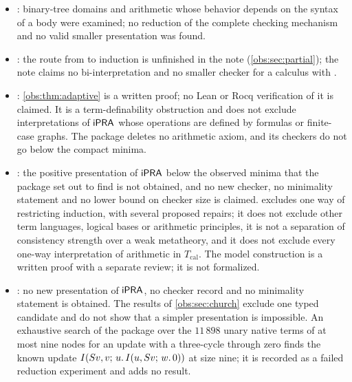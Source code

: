 \begin{itemize}
Replacing computation supply by numerical definitional conversion requires a
reducer that respects dummy slots, the state binder, neutral counters and rigid
parameters, and gave no smaller checker. Binders in the certificate grammar,
with eigenparameters allocated by the opener, require a new proof-opening
discipline, and no complete smaller construction was obtained.
\item {}: binary-tree domains and arithmetic whose
behavior depends on the syntax of a body were examined; no reduction of the
complete checking mechanism and no valid smaller presentation was found.
\item {}: the route from  to induction is
unfinished in the note (\cref{obs:sec:partial}); the note claims no
bi-interpretation and no smaller checker for a calculus with .
\item {}: \cref{obs:thm:adaptive} is a written proof; no
Lean or Rocq verification of it is claimed. It is a term-definability
obstruction and does not exclude interpretations of $\mathsf{iPRA}$ whose operations
are defined by formulas or finite-case graphs. The package deletes no
arithmetic axiom, and its checkers do not go below the compact minima.
\item {}: the positive presentation of $\mathsf{iPRA}$ below the
observed minima that the package set out to find is not obtained, and no new
checker, no minimality statement and no lower bound on checker size is
claimed.  excludes one way of restricting
induction, with several proposed repairs; it does not exclude other term
languages, logical bases or arithmetic principles, it is not a separation of
consistency strength over a weak metatheory, and it does not exclude every
one-way interpretation of arithmetic in $T_{\mathrm{cal}}$. The model
construction is a written proof with a separate review; it is not formalized.
\item {}: no new presentation of $\mathsf{iPRA}$, no checker record
and no minimality statement is obtained. The results of \cref{obs:sec:church}
exclude one typed candidate and do not show that a simpler presentation is
impossible. An exhaustive search of the package over the $11\,898$ unary native
terms of at most nine nodes for an update with a three-cycle through zero finds
the known update $I(S v,v;\,u.\,I(u,S v;\,w.\,0))$ at size nine; it is
recorded as a failed reduction experiment and adds no result.
\end{itemize}

